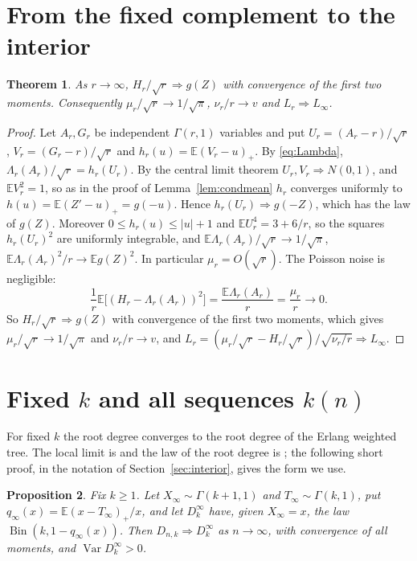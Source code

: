 \documentclass[11pt]{amsart}
\newtheorem{theorem}{Theorem}[section]
\newtheorem{proposition}[theorem]{Proposition}
\theoremstyle{remark}
\numberwithin{equation}{section}
\newcommand{\E}{\mathbb E}
\newcommand{\1}{\mathbf 1}
\newcommand{\Var}{\operatorname{Var}}
\newcommand{\Bin}{\operatorname{Bin}}
\begin{document}
\section{From the fixed complement to the interior}\label{sec:glue}

\begin{theorem}\label{thm:glue}
As $r\to\infty$, $H_r/\sqrt r\Rightarrow g(Z)$ with convergence of the first two moments. Consequently $\mu_r/\sqrt r\to1/\sqrt\pi$, $\nu_r/r\to v$ and $L_r\Rightarrow L_\infty$.
\end{theorem}

\begin{proof}
Let $A_r,G_r$ be independent $\Gamma(r,1)$ variables and put $U_r=(A_r-r)/\sqrt r$, $V_r=(G_r-r)/\sqrt r$ and $h_r(u)=\E(V_r-u)_+$. By \eqref{eq:Lambda}, $\Lambda_r(A_r)/\sqrt r=h_r(U_r)$. By the central limit theorem $U_r,V_r\Rightarrow N(0,1)$, and $\E V_r^2=1$, so as in the proof of Lemma~\ref{lem:condmean} $h_r$ converges uniformly to $h(u)=\E(Z'-u)_+=g(-u)$. Hence $h_r(U_r)\Rightarrow g(-Z)$, which has the law of $g(Z)$. Moreover $0\le h_r(u)\le|u|+1$ and $\E U_r^4=3+6/r$, so the squares $h_r(U_r)^2$ are uniformly integrable, and $\E\Lambda_r(A_r)/\sqrt r\to1/\sqrt\pi$, $\E\Lambda_r(A_r)^2/r\to\E g(Z)^2$. In particular $\mu_r=O(\sqrt r)$. The Poisson noise is negligible:
\[
\frac1r\E\bigl[(H_r-\Lambda_r(A_r))^2\bigr]=\frac{\E\Lambda_r(A_r)}r=\frac{\mu_r}r\to0.
\]
So $H_r/\sqrt r\Rightarrow g(Z)$ with convergence of the first two moments, which gives $\mu_r/\sqrt r\to1/\sqrt\pi$ and $\nu_r/r\to v$, and $L_r=(\mu_r/\sqrt r-H_r/\sqrt r)/\sqrt{\nu_r/r}\Rightarrow L_\infty$.
\end{proof}

\section{Fixed \texorpdfstring{$k$}{k} and all sequences \texorpdfstring{$k(n)$}{k(n)}}\label{sec:class}

For fixed $k$ the root degree converges to the root degree of the Erlang weighted tree. The local limit is \cite[Theorem~2.1]{EWT} and the law of the root degree is \cite[Theorem~5.1]{EWT}; the following short proof, in the notation of Section~\ref{sec:interior}, gives the form we use.

\begin{proposition}\label{prop:fixedk}
Fix $k\ge1$. Let $X_\infty\sim\Gamma(k+1,1)$ and $T_\infty\sim\Gamma(k,1)$, put $q_\infty(x)=\E(x-T_\infty)_+/x$, and let $D_k^\infty$ have, given $X_\infty=x$, the law $\Bin(k,1-q_\infty(x))$. Then $D_{n,k}\Rightarrow D_k^\infty$ as $n\to\infty$, with convergence of all moments, and $\Var D_k^\infty>0$.
\end{proposition}
\end{document}
